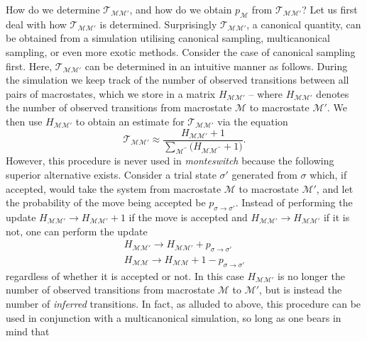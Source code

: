 \documentclass{report}
\begin{document}
How do we determine $\mathcal{T}_{\mathcal{MM}'}$, and how do we obtain $p_{\mathcal{M}}$ from $\mathcal{T}_{\mathcal{MM}'}$? Let us first deal with how
$\mathcal{T}_{\mathcal{MM}'}$ is determined.
Surprisingly $\mathcal{T}_{\mathcal{MM}'}$, a canonical quantity, can be obtained from a simulation utilising canonical sampling, multicanonical sampling,
or even more exotic methods. Consider the case of canonical sampling first.
Here, $\mathcal{T}_{\mathcal{MM}'}$ can be determined in an intuitive manner as follows. During the simulation we keep track of the 
number of observed transitions between all pairs of macrostates, which we store in a matrix $H_{\mathcal{M}\mathcal{M}'}$ -- where $H_{\mathcal{M}\mathcal{M}'}$
denotes the number of observed transitions from macrostate $\mathcal{M}$ to macrostate $\mathcal{M}'$. We then use $H_{\mathcal{M}\mathcal{M}'}$ to obtain
an estimate for $\mathcal{T}_{\mathcal{M}\mathcal{M}'}$ via the equation
\begin{equation}\label{T_estimate}
\mathcal{T}_{\mathcal{M}\mathcal{M}'}\approx \frac{H_{\mathcal{M}\mathcal{M}'}+1}
{\displaystyle\sum_{\mathcal{M}^{\prime\prime}}\bigl(H_{\mathcal{M}\mathcal{M}^{\prime\prime}}+1\bigr)}.
\end{equation}
However, this procedure is never used in \emph{monteswitch} because the following superior alternative exists. Consider a trial state $\sigma'$ 
generated from $\sigma$ which, if accepted, would take the system from macrostate $\mathcal{M}$ to macrostate $\mathcal{M}'$, and let the probability 
of the move being accepted be $p_{\sigma\to\sigma'}$. Instead of performing the update $H_{\mathcal{M}\mathcal{M}'}\to H_{\mathcal{M}\mathcal{M}'}+1$ if the move is 
accepted and $H_{\mathcal{M}\mathcal{M}'}\to H_{\mathcal{M}\mathcal{M}'}$ if it is not, one can perform the update 
\begin{equation}
\begin{split}
H_{\mathcal{M}\mathcal{M}'}\to H_{\mathcal{M}\mathcal{M}'}+p_{\sigma\to\sigma'} \\
H_{\mathcal{M}\mathcal{M}}\to H_{\mathcal{M}\mathcal{M}}+1-p_{\sigma\to\sigma'}
\end{split}
\end{equation} 
regardless of whether it is accepted or not. In this case $H_{\mathcal{M}\mathcal{M}'}$ is no longer the number of observed transitions from macrostate 
$\mathcal{M}$ to $\mathcal{M}'$, but is instead the number of \emph{inferred} transitions. 
In fact, as alluded to above, this procedure can be used in conjunction with a multicanonical simulation, so long as one bears in mind that
\end{document}

